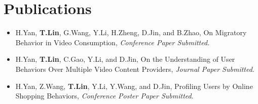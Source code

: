 \documentclass[letterpaper,11pt]{article}
\makeatletter
\newcommand{\resumeSubheadinghonor}[3]{
  \vspace{-1pt}\item
    \begin{tabular*}{0.97\textwidth}{l@{\extracolsep{\fill}}r}
      \textbf{#1} {#2}\\
      ~~\textit{\small#3}\\
    \end{tabular*}\vspace{-5pt}
}
\newcommand{\sectionwithbox}[1]{
  \section{\colorbox[rgb]{0.8,0.8,0.8}{{#1}}}
}
\newcommand{\resumeSubheadingPublication}[1]{
  \vspace{-1pt}\item
      {#1}
    \vspace{-5pt}
}
\newcommand{\resumeSubHeadingListStart}{\begin{itemize}[leftmargin=*]}
\newcommand{\resumeSubHeadingListEnd}{\end{itemize}}
\makeatother
\begin{document}
    



\sectionwithbox{Publications}
  \resumeSubHeadingListStart
	\resumeSubheadingPublication{H.Yan, \textbf{T.Lin}, G.Wang, Y.Li, H.Zheng, D.Jin, and B.Zhao, On Migratory Behavior in Video Consumption, \emph{Conference Paper Submitted}.}
	\resumeSubheadingPublication{H.Yan, \textbf{T.Lin}, C.Gao, Y.Li, and D.Jin, On the Understanding of User Behaviors Over Multiple Video Content Providers, \emph{Journal Paper Submitted}.}
	\resumeSubheadingPublication{H.Yan, Z.Wang, \textbf{T.Lin}, Y.Li, Y.Wang, and D.Jin, Profiling Users by Online Shopping Behaviors, \emph{Conference Poster Paper Submitted}.}
  \resumeSubHeadingListEnd
  
  
\end{document}
